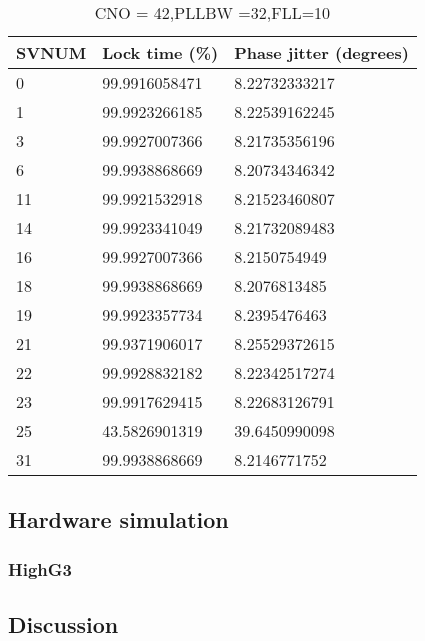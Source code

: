 \begin{table}[]
\centering
\begin{tabular}{|l|l|l|}
\hline
\rowcolor[HTML]{C0C0C0} 
SVNUM & Lock time (\%) & Phase jitter (degrees) \\ \hline
0     & 99.9916058471  & 8.22732333217          \\ \hline
\rowcolor[HTML]{EFEFEF} 
1     & 99.9923266185  & 8.22539162245          \\ \hline
3     & 99.9927007366  & 8.21735356196          \\ \hline
\rowcolor[HTML]{EFEFEF} 
6     & 99.9938868669  & 8.20734346342          \\ \hline
11    & 99.9921532918  & 8.21523460807          \\ \hline
\rowcolor[HTML]{EFEFEF} 
14    & 99.9923341049  & 8.21732089483          \\ \hline
16    & 99.9927007366  & 8.2150754949           \\ \hline
\rowcolor[HTML]{EFEFEF} 
18    & 99.9938868669  & 8.2076813485           \\ \hline
19    & 99.9923357734  & 8.2395476463           \\ \hline
\rowcolor[HTML]{EFEFEF} 
21    & 99.9371906017  & 8.25529372615          \\ \hline
22    & 99.9928832182  & 8.22342517274          \\ \hline
\rowcolor[HTML]{EFEFEF} 
23    & 99.9917629415  & 8.22683126791          \\ \hline
25    & 43.5826901319  & 39.6450990098          \\ \hline
\rowcolor[HTML]{EFEFEF} 
31    & 99.9938868669  & 8.2146771752           \\ \hline
\end{tabular}
\caption{CNO = 42,PLLBW =32,FLL=10}
\label{my-label}
\end{table}

\subsection{Hardware simulation}

\subsubsection{HighG3}

\subsection{Discussion}





